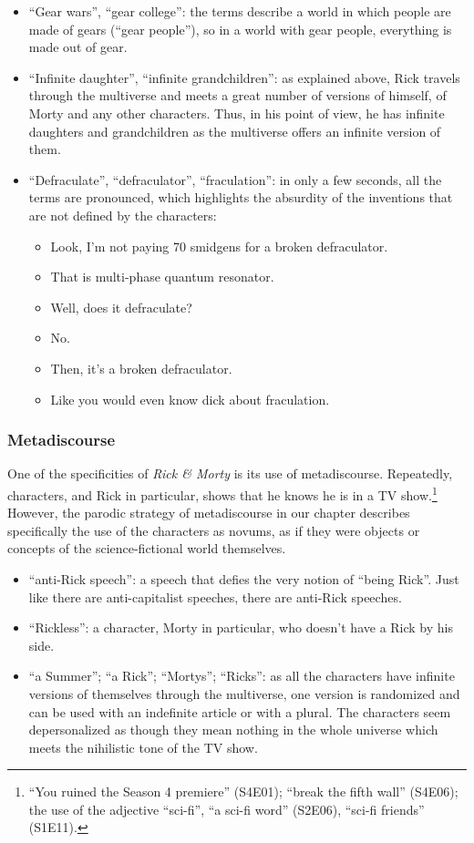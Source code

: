 \documentclass[output=paper]{langscibook}
\begin{document}
\begin{itemize}
\item “Gear wars”, “gear college”: the terms describe a world in which people are made of gears (“gear people”), so in a world with gear people, everything is made out of gear.
\item “Infinite daughter”, “infinite grandchildren”: as explained above, Rick travels through the multiverse and meets a great number of versions of himself, of Morty and any other characters. Thus, in his point of view, he has infinite daughters and grandchildren as the multiverse offers an infinite version of them.
\item “Defraculate”, “defraculator”, “fraculation”: in only a few seconds, all the terms are pronounced, which highlights the absurdity of the inventions that are not defined by the characters:

\begin{itemize}
\item Look, I’m not paying 70 smidgens for a broken defraculator.
\item That is multi-phase quantum resonator.
\item Well, does it defraculate?
\item No.
\item Then, it’s a broken defraculator.
\item Like you would even know dick about fraculation.\end{itemize}
\end{itemize}

\subsubsection{Metadiscourse}

One of the specificities of \textit{Rick \& Morty} is its use of metadiscourse. Repeatedly, characters, and Rick in particular, shows that he knows he is in a TV show.\footnote{“You ruined the Season 4 premiere” (S4E01); “break the fifth wall” (S4E06); the use of the adjective “sci-fi”, “a sci-fi word” (S2E06), “sci-fi friends” (S1E11).} However, the parodic strategy of metadiscourse in our chapter describes specifically the use of the characters as novums, as if they were objects or concepts of the science-fictional world themselves.

\begin{itemize}
\item “anti-Rick speech”: a speech that defies the very notion of “being Rick”. Just like there are anti-capitalist speeches, there are anti-Rick speeches.
\item “Rickless”: a character, Morty in particular, who doesn’t have a Rick by his side.
\item “a Summer”; “a Rick”; “Mortys”; “Ricks”: as all the characters have infinite versions of themselves through the multiverse, one version is randomized and can be used with an indefinite article or with a plural. The characters seem depersonalized as though they mean nothing in the whole universe which meets the nihilistic tone of the TV show.
\end{itemize}
\end{document}
